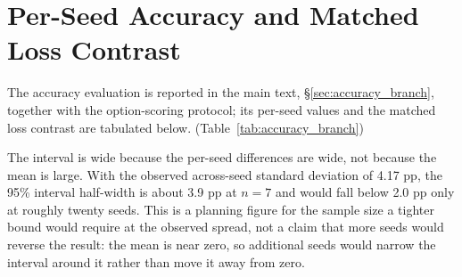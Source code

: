 \section{Per-Seed Accuracy and Matched Loss Contrast}
\label{app:accuracy_seeds}

The accuracy evaluation is reported in the main text, \S\ref{sec:accuracy_branch}, together with the option-scoring protocol; its per-seed values and the matched loss contrast are tabulated below. (Table~\ref{tab:accuracy_branch})

The interval is wide because the per-seed differences are wide, not because the mean is large. With the observed across-seed standard deviation of 4.17 pp, the 95\% interval half-width is about 3.9 pp at $n=7$ and would fall below 2.0 pp only at roughly twenty seeds. This is a planning figure for the sample size a tighter bound would require at the observed spread, not a claim that more seeds would reverse the result: the mean is near zero, so additional seeds would narrow the interval around it rather than move it away from zero.

